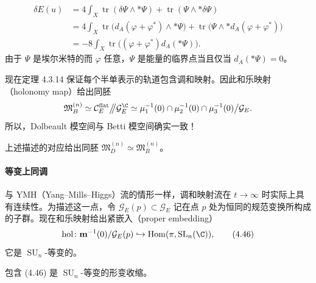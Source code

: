 \[
\begin{aligned}
\delta E(u)&=4\int_X\operatorname{tr}(\delta\Psi\wedge*\Psi)+\operatorname{tr}(\Psi\wedge*\delta\Psi)\\
&=4\int_X\operatorname{tr}\bigl(d_A(\varphi+\varphi^*)\wedge*\Psi\bigr)+\operatorname{tr}\bigl(\Psi\wedge*d_A(\varphi+\varphi^*)\bigr)\\
&=-8\int_X\operatorname{tr}\bigl((\varphi+\varphi^*)d_A(*\Psi)\bigr).
\end{aligned}
\]
由于 $\Psi$ 是埃尔米特的而 $\varphi$ 任意，$\Psi$ 是能量的临界点当且仅当 $d_A(*\Psi)=0$。

现在定理 4.3.14 保证每个半单表示的轨道包含调和映射。因此和乐映射（holonomy map）给出同胚
\[
\mathfrak{M}^{(n)}_B\simeq\mathcal{C}^{\mathrm{flat}}_E\big/\!\!\big/\mathcal{G}^{\C}_E\simeq\mu_1^{-1}(0)\cap\mu_2^{-1}(0)\cap\mu_3^{-1}(0)\big/\mathcal{G}_E.
\]
所以，Dolbeault 模空间与 Betti 模空间确实一致！

\begin{theorem}[{Simpson，[60, 61]}]
上述描述的对应给出同胚 $\mathfrak{M}^{(n)}_D\simeq\mathfrak{M}^{(n)}_B$。
\end{theorem}

\paragraph{等变上同调} 与 YMH（Yang--Mills--Higgs）流的情形一样，调和映射流在 $t\to\infty$ 时实际上具有连续性。为描述这一点，令 $\mathcal{G}_E(p)\subset \mathcal{G}_E$ 记在点 $p$ 处为恒同的规范变换所构成的子群。现在和乐映射给出紧嵌入（proper embedding）
\begin{equation}
\mathrm{hol}\colon\mathbf{m}^{-1}(0)/\mathcal{G}_E(p)\hookrightarrow\operatorname{Hom}(\pi,\operatorname{SL}_n(\C)),
\label{eq:4.46}\tag{4.46}
\end{equation}
它是 $\operatorname{SU}_n$-等变的。

\begin{theorem}[{参看 [15]}]
包含 (4.46) 是 $\operatorname{SU}_n$-等变的形变收缩。
\end{theorem}

